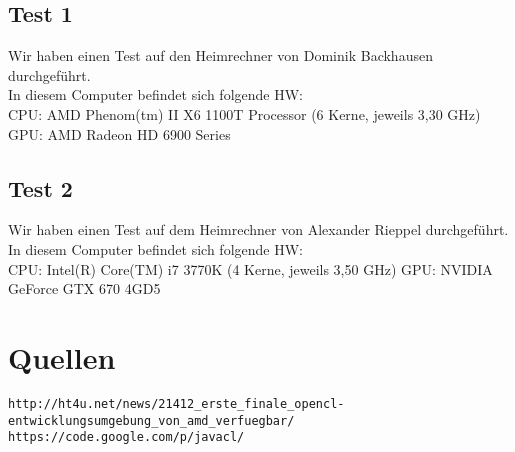 \documentclass[a4paper,12pt]{scrreprt}
\begin{document}
\section{Test 1}
Wir haben einen Test auf den Heimrechner von Dominik Backhausen durchgeführt.\\
In diesem Computer befindet sich folgende HW:\\
CPU: AMD Phenom(tm) II X6 1100T Processor (6 Kerne, jeweils 3,30 GHz)
GPU: AMD Radeon HD 6900 Series



\section{Test 2}
Wir haben einen Test auf dem Heimrechner von Alexander Rieppel durchgeführt.\\
In diesem Computer befindet sich folgende HW:\\
CPU: Intel(R) Core(TM) i7 3770K (4 Kerne, jeweils 3,50 GHz)
GPU: NVIDIA GeForce GTX 670 4GD5



\chapter{Quellen}

\nolinkurl{http://ht4u.net/news/21412_erste_finale_opencl-entwicklungsumgebung_von_amd_verfuegbar/}\\
\nolinkurl{https://code.google.com/p/javacl/}

	
\end{document}
